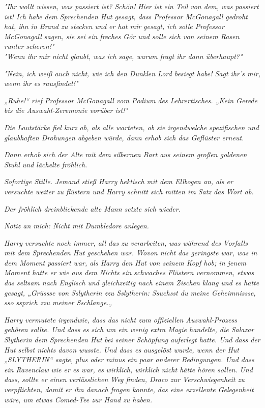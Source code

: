 {\emph{"Ihr wollt wissen, was passiert ist? Schön!} \emph{Hier} \emph{ist ein Teil von dem, was passiert ist! Ich habe dem Sprechenden Hut gesagt, dass Professor McGonagall gedroht hat, ihn in Brand zu stecken und er hat mir gesagt, ich solle Professor McGonagall sagen, sie sei ein freches Gör und solle sich von seinem Rasen runter scheren!"}\\ \emph{"Wenn ihr mir nicht glaubt, was ich sage, warum} \emph{\emph{fragt ihr dann überhaupt?}"}

\emph{"Nein, ich weiß auch nicht, wie ich den Dunklen Lord besiegt habe! Sagt ihr's mir, wenn ihr es rausfindet!"}

\emph{„\emph{Ruhe!}“ rief Professor McGonagall vom Podium des Lehrertisches. „\emph{Kein Gerede bis die Auswahl-Zeremonie vorüber ist!}"}

\emph{Die Lautstärke fiel kurz ab, als alle warteten, ob sie irgendwelche spezifischen und glaubhaften Drohungen abgeben würde, dann erhob sich das Geflüster erneut.}

\emph{Dann erhob sich der Alte mit dem silbernen Bart aus seinem großen goldenen Stuhl und lächelte fröhlich.}

\emph{Sofortige Stille. Jemand stieß Harry hektisch mit dem Ellbogen an, als er versuchte weiter zu flüstern und Harry schnitt sich mitten im Satz das Wort ab.}

\emph{Der fröhlich dreinblickende alte Mann setzte sich wieder.}

\emph{\emph{Notiz an mich: Nicht mit Dumbledore anlegen.}}

\emph{Harry versuchte noch immer, all das zu verarbeiten, was während des Vorfalls mit dem Sprechenden Hut geschehen war. Wovon nicht das geringste war, was in dem Moment passiert war, als Harry den Hut von seinem Kopf hob; in jenem Moment hatte er wie aus dem Nichts ein schwaches Flüstern vernommen, etwas das seltsam nach Englisch und gleichzeitig nach einem Zischen klang und es hatte gesagt, „\emph{Grüssse von Sslytherin zzu Sslytherin: Ssuchsst du meine Geheimnissse, sso s}\emph{s}\emph{prich zzu meiner Sschlange.}„}

\emph{Harry vermutete irgendwie, dass das nicht zum offiziellen Auswahl-Prozess} \emph{gehören sollte. Und dass es sich um ein wenig extra Magie handelte, die Salazar Slytherin dem Sprechenden Hut} \emph{bei seiner Schöpfung} \emph{auferlegt hatte. Und dass der Hut selbst nichts davon wusste. Und dass es ausgelöst wurde, wenn der Hut „SLYTHERIN“ sagte, plus oder minus ein paar anderer Bedingungen. Und dass ein Ravenclaw wie er es war, es} \emph{\emph{wirklich, wirklich nicht hätte hören sollen.}} \emph{Und dass, sollte er einen verlässlichen Weg finden, Draco zur Verschwiegenheit zu verpflichten, damit er ihn danach fragen konnte, das eine exzellente Gelegenheit wäre, um etwas Comed-Tee zur Hand zu haben.}

}
